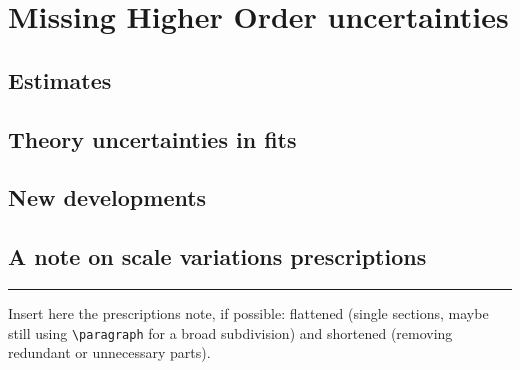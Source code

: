 
\chapter{Missing Higher Order uncertainties}
\label{ch:mhou}
\minitoc
\adjustmtc



\section{Estimates}
\label{sec:mhou/estimates}


\section{Theory uncertainties in \pdf fits}
\label{sec:mhou/pdf}


\section{New developments}
\label{sec:mhou/new}


\section{A note on scale variations prescriptions}
\label{sec:mhou/prescriptions}


\vspace*{20pt}
\noindent
\rule{\hsize}{1pt}

Insert here the prescriptions note, if possible: flattened (single sections,
maybe still using \lstinline{\paragraph} for a broad subdivision) and shortened
(removing redundant or unnecessary parts).

